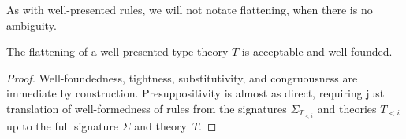 \noindent As with well-presented rules, we will not notate flattening, when there is no ambiguity.

\begin{proposition}
  The flattening of a well-presented type theory $T$ is acceptable and well-founded.
\end{proposition}

\begin{proof}
  Well-foundedness, tightness, substitutivity, and congruousness are immediate by construction.
  Presuppositivity is almost as direct, requiring just translation of well-formedness of rules from the signatures $\Sigma_{T_{<i}}$ and theories $T_{<i}$ up to the full signature $\Sigma$ and theory~$T$.
\end{proof}



